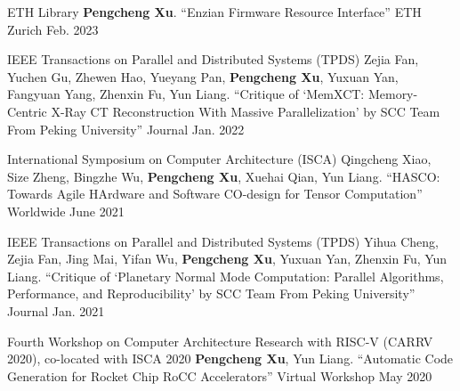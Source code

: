


\begin{cventries}

  \cventry
    {ETH Library}
    {{\normalfont \textbf{Pengcheng Xu}. ``Enzian Firmware Resource Interface''}}
    {ETH Zurich} %
    {Feb. 2023} %
    {}

  \cventry
    {IEEE Transactions on Parallel and Distributed Systems (TPDS)}
    {{\normalfont Zejia Fan, Yuchen Gu, Zhewen Hao, Yueyang Pan, \textbf{Pengcheng Xu}, Yuxuan Yan, Fangyuan Yang, Zhenxin Fu, Yun Liang. ``Critique of `MemXCT: Memory-Centric X-Ray CT Reconstruction With Massive Parallelization' by SCC Team From Peking University''}}
    {Journal} %
    {Jan. 2022} %
    {}

  \cventry
    {International Symposium on Computer Architecture (ISCA)}
    {{\normalfont Qingcheng Xiao, Size Zheng, Bingzhe Wu, \textbf{Pengcheng Xu}, Xuehai Qian, Yun Liang. ``HASCO: Towards Agile HArdware and Software CO-design for Tensor Computation''}}
    {Worldwide} %
    {June 2021} %
    {}

  \cventry
    {IEEE Transactions on Parallel and Distributed Systems (TPDS)}
    {{\normalfont Yihua Cheng, Zejia Fan, Jing Mai, Yifan Wu, \textbf{Pengcheng Xu}, Yuxuan Yan, Zhenxin Fu, Yun Liang. ``Critique of `Planetary Normal Mode Computation: Parallel Algorithms, Performance, and Reproducibility' by SCC Team From Peking University''}}
    {Journal} %
    {Jan. 2021} %
    {}

  \cventry
    {Fourth Workshop on Computer Architecture Research with RISC-V (CARRV 2020), co-located with ISCA 2020} %
    {{\normalfont \textbf{Pengcheng Xu}, Yun Liang. ``Automatic Code Generation for Rocket Chip RoCC Accelerators''}} %
    {Virtual Workshop} %
    {May 2020} %
    {}
\end{cventries}
